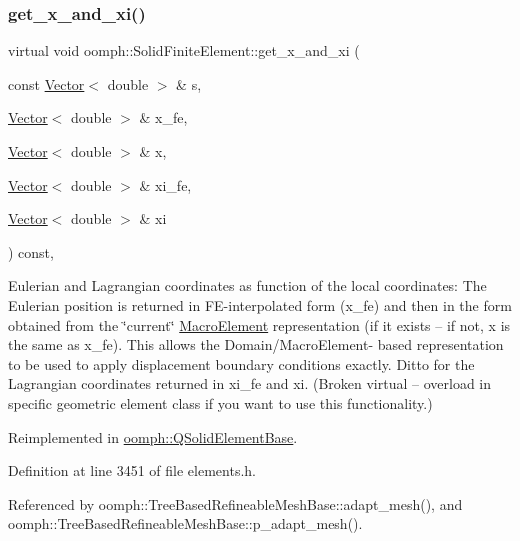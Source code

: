 \subsubsection{\texorpdfstring{get\+\_\+x\+\_\+and\+\_\+xi()}{get\_x\_and\_xi()}}
{\footnotesize\ttfamily virtual void oomph\+::\+Solid\+Finite\+Element\+::get\+\_\+x\+\_\+and\+\_\+xi (\begin{DoxyParamCaption}\item[{const \hyperlink{classoomph_1_1Vector}{Vector}$<$ double $>$ \&}]{s,  }\item[{\hyperlink{classoomph_1_1Vector}{Vector}$<$ double $>$ \&}]{x\+\_\+fe,  }\item[{\hyperlink{classoomph_1_1Vector}{Vector}$<$ double $>$ \&}]{x,  }\item[{\hyperlink{classoomph_1_1Vector}{Vector}$<$ double $>$ \&}]{xi\+\_\+fe,  }\item[{\hyperlink{classoomph_1_1Vector}{Vector}$<$ double $>$ \&}]{xi }\end{DoxyParamCaption}) const\hspace{0.3cm}{\ttfamily [inline]}, {\ttfamily [virtual]}}



Eulerian and Lagrangian coordinates as function of the local coordinates\+: The Eulerian position is returned in F\+E-\/interpolated form ({\ttfamily x\+\_\+fe}) and then in the form obtained from the \char`\"{}current\char`\"{} \hyperlink{classoomph_1_1MacroElement}{Macro\+Element} representation (if it exists -- if not, {\ttfamily x} is the same as {\ttfamily x\+\_\+fe}). This allows the Domain/\+Macro\+Element-\/ based representation to be used to apply displacement boundary conditions exactly. Ditto for the Lagrangian coordinates returned in xi\+\_\+fe and xi. (Broken virtual -- overload in specific geometric element class if you want to use this functionality.) 



Reimplemented in \hyperlink{classoomph_1_1QSolidElementBase_a2afc3bfd3aa6ed253f42d55ac4e20839}{oomph\+::\+Q\+Solid\+Element\+Base}.



Definition at line 3451 of file elements.\+h.



Referenced by oomph\+::\+Tree\+Based\+Refineable\+Mesh\+Base\+::adapt\+\_\+mesh(), and oomph\+::\+Tree\+Based\+Refineable\+Mesh\+Base\+::p\+\_\+adapt\+\_\+mesh().

\mbox{\label{classoomph_1_1SolidFiniteElement_aa68837a8f6d1cb021d5cae9c2968a6f3}} 
